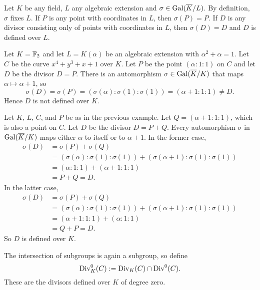 \begin{example}
  Let $K$ be any field, $L$ any algebraic extension and $\sigma \in \operatorname{Gal}(\overline K/L)$.
  By definition, $\sigma$ fixes $L$.
  If $P$ is any point with coordinates in $L$, then $\sigma(P) = P$.
  If $D$ is any divisor consisting only of points with coordinates in $L$, then $\sigma(D) = D$ and $D$ is defined over $L$.
\end{example}
\begin{example}
  Let $K = \mathbb{F}_2$ and let $L = K(\alpha)$ be an algebraic extension with $\alpha^2 + \alpha = 1$.
  Let $C$ be the curve $x^4 + y^3 + x + 1$ over $K$.
  Let $P$ be the point $(\alpha : 1 : 1)$ on $C$ and let $D$ be the divisor $D = P$.
  There is an automorphism $\sigma \in \operatorname{Gal}(\overline K/K)$ that maps $\alpha \mapsto \alpha + 1$, so 
    \[ \sigma(D) = \sigma(P) = (\sigma(\alpha) : \sigma(1) : \sigma(1)) = (\alpha + 1 : 1 : 1) \neq D. \]
  Hence $D$ is not defined over $K$.
\end{example}
\begin{example}
  Let $K$, $L$, $C$, and $P$ be as in the previous example.
  Let $Q = (\alpha + 1 : 1 : 1)$, which is also a point on $C$.
  Let $D$ be the divisor $D = P + Q$.
  Every automorphism $\sigma$ in $\operatorname{Gal}(\overline K/K)$ maps either $\alpha$ to itself or to $\alpha + 1$.
  In the former case,
  \begin{align*}
    \sigma(D) &= \sigma(P) + \sigma(Q) \\
              &= (\sigma(\alpha) : \sigma(1) : \sigma(1)) + (\sigma(\alpha + 1) : \sigma(1) : \sigma(1)) \\
              &= (\alpha : 1 : 1) + (\alpha + 1 : 1 : 1) \\
              &= P + Q = D.
  \end{align*}
  In the latter case,
  \begin{align*}
    \sigma(D) &= \sigma(P) + \sigma(Q) \\
              &= (\sigma(\alpha) : \sigma(1) : \sigma(1)) + (\sigma(\alpha + 1) : \sigma(1) : \sigma(1)) \\
              &= (\alpha + 1 : 1 : 1) + (\alpha : 1 : 1) \\
              &= Q + P = D.
  \end{align*}
  So $D$ is defined over $K$.
\end{example}

The intersection of subgroups is again a subgroup, so define
  \[ \operatorname{Div}_K^0(C) := \operatorname{Div}_K(C) \cap \operatorname{Div}^0(C). \]
These are the divisors defined over $K$ of degree zero.

